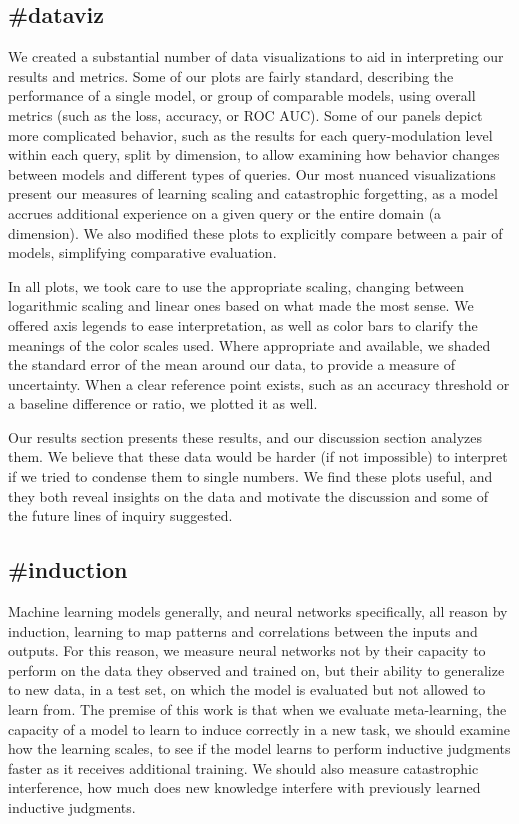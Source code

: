 \subsection{\#dataviz}
We created a substantial number of data visualizations to aid in interpreting our results and metrics. Some of our plots are fairly standard, describing the performance of a single model, or group of comparable models, using overall metrics (such as the loss, accuracy, or ROC AUC). Some of our panels depict more complicated behavior, such as the results for each query-modulation level within each query, split by dimension, to allow examining how behavior changes between models and different types of queries. Our most nuanced visualizations present our measures of learning scaling and catastrophic forgetting, as a model accrues additional experience on a given query or the entire domain (a dimension). We also modified these plots to explicitly compare between a pair of models, simplifying comparative evaluation. 

In all plots, we took care to use the appropriate scaling, changing between logarithmic scaling and linear ones based on what made the most sense. We offered axis legends to ease interpretation, as well as color bars to clarify the meanings of the color scales used. Where appropriate and available, we shaded the standard error of the mean around our data, to provide a measure of uncertainty. When a clear reference point exists, such as an accuracy threshold or a baseline difference or ratio, we plotted it as well.

Our results section presents these results, and our discussion section analyzes them. We believe that these data would be harder (if not impossible) to interpret if we tried to condense them to single numbers. We find these plots useful, and they both reveal insights on the data and motivate the discussion and some of the future lines of inquiry suggested.

\subsection{\#induction}
Machine learning models generally, and neural networks specifically, all reason by induction, learning to map patterns and correlations between the inputs and outputs. For this reason, we measure neural networks not by their capacity to perform on the data they observed and trained on, but their ability to generalize to new data, in a test set, on which the model is evaluated but not allowed to learn from. The premise of this work is that when we evaluate meta-learning, the capacity of a model to learn to induce correctly in a new task, we should examine how the learning scales, to see if the model learns to perform inductive judgments faster as it receives additional training. We should also measure catastrophic interference, how much does new knowledge interfere with previously learned inductive judgments. 

